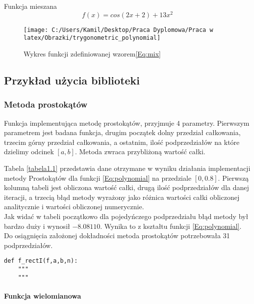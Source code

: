\documentclass[12pt,twoside]{article}
\begin{document}
Funkcja mieszana
\begin{equation}
f(x) = cos(2x+2) + 13x^2
\label{Eq:mix}
\end{equation}

\begin{figure}
\texttt{[image: C:/Users/Kamil/Desktop/Praca Dyplomowa/Praca w latex/Obrazki/trygonometric\_polynomial]}
\caption{Wykres funkcji zdefiniowanej wzorem\eqref{Eq:mix}}
\end{figure}

\subsection{Przykład użycia biblioteki}
\subsubsection{Metoda prostokątów}
	Funkcja implementująca metodę prostokątów, przyjmuje 4 parametry. Pierwszym parametrem jest badana funkcja, drugim początek dolny przedział całkowania, trzecim górny przedział całkowania, a ostatnim, ilość podprzedziałów na które dzielimy odcinek $[a,b]$. Metoda zwraca przybliżoną wartość całki.
	
	Tabela \eqref{tabela1.1} przedstawia dane otrzymane w wyniku działania implementacji metody Prostokątów dla funkcji \eqref{Eq:polynomial} na przedziale $[0,0.8]$.
	Pierwszą kolumną tabeli jest obliczona wartość całki, drugą ilość podprzedziałów dla danej iteracji, a trzecią błąd metody wyrażony jako różnica wartości całki obliczonej 			analitycznie i wartości obliczonej numerycznie.\\
	Jak widać w tabeli początkowo dla pojedyńczego podprzedziału błąd metody był bardzo duży i wynosił $-8.08110$. Wynika to z kształtu funkcji \eqref{Eq:polynomial}.\\
	Do osiągnięcia założonej dokładności metoda prostokątów potrzebowała 31 podprzedziałów.
	
\begin{lstlisting}[caption={Kod w języku python implementujący metodę prostokątów}]
def f_rectI(f,a,b,n):
    """
    """
\end{lstlisting}
\label{Listing 6}


\paragraph{Funkcja wielomianowa}\mbox{} \\
\end{document}
